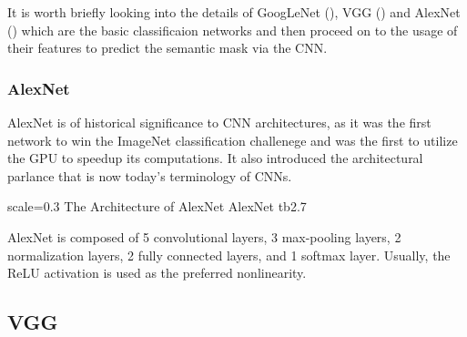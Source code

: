 It is worth briefly looking into the details of GoogLeNet (\cite{Szegedy2015}), VGG (\cite{Simonyan2015}) and AlexNet (\cite{Krizhevsky2012}) which are the basic classificaion networks and then proceed on to the usage of their features to predict the semantic mask via the CNN. 

\subsubsection{AlexNet}
AlexNet is of historical significance to CNN architectures, as it was the first network to win the ImageNet classification challenege and was the first to utilize the GPU to speedup its computations. It also introduced the architectural parlance that is now today's terminology of CNNs. 

{scale=0.3}%
{The Architecture of AlexNet}%
{AlexNet}%
{tb2.7} %

AlexNet is composed of 5 convolutional layers, 3 max-pooling layers, 2 normalization layers, 2 fully connected layers, and 1 softmax layer. Usually, the ReLU activation is used as the preferred nonlinearity. 

\subsection{VGG}









 



















 



















 



 





